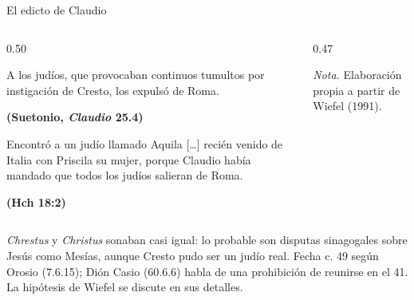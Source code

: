 \documentclass[hyperref={bookmarks=false},aspectratio=169]{beamer}
\newcommand{\fuente}[1]{\par\hfill{\upshape\bfseries\footnotesize\textcolor{ladrillo}{#1}}}
\begin{document}
\begin{frame}{El edicto de Claudio}
\begin{columns}[T,onlytextwidth]
\begin{column}{0.50\textwidth}
\begin{cita}A los judíos, que provocaban continuos tumultos por instigación de Cresto, los expulsó de Roma.\fuente{(Suetonio, \emph{Claudio} 25.4)}\end{cita}
\begin{cita}Encontró a un judío llamado Aquila [\ldots] recién venido de Italia con Priscila su mujer, porque Claudio había mandado que todos los judíos salieran de Roma.\fuente{(Hch 18:2)}\end{cita}
\end{column}
\begin{column}{0.47\textwidth}
\centering
{}\par
{\fontsize{5}{6}\selectfont\color{sepia}\hfill\textit{Nota.} Elaboración propia a partir de Wiefel (1991).\par}
\end{column}
\end{columns}
\begin{notalam}
\emph{Chrestus} y \emph{Christus} sonaban casi igual: lo probable son disputas sinagogales sobre Jesús como Mesías, aunque Cresto pudo ser un judío real. Fecha c. 49 según Orosio (7.6.15); Dión Casio (60.6.6) habla de una prohibición de reunirse en el 41. La hipótesis de Wiefel se discute en sus detalles.
\end{notalam}
\end{frame}
\end{document}
